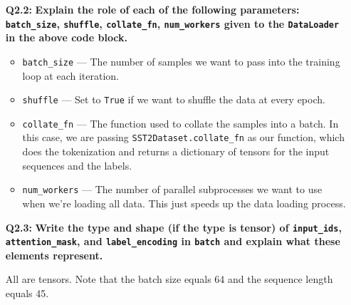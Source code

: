 \documentclass{article}
\begin{document}
\begin{itemize}
\begin{itemize}
        \item[\textbf{Q2.2:}] \textbf{Explain the role of each of the following
        parameters: \texttt{batch\_size}, \texttt{shuffle},
        \texttt{collate\_fn}, \texttt{num\_workers} given to the
        \texttt{DataLoader} in the above code block.}

        \begin{itemize}
            \item \texttt{batch\_size} --- The number of samples we want to pass
            into the training loop at each iteration.
            \item \texttt{shuffle} --- Set to \texttt{True} if we want to
            shuffle the data at every epoch.
            \item \texttt{collate\_fn} --- The function used to collate the
            samples into a batch. In this case, we are passing
            \texttt{SST2Dataset.collate\_fn} as our function, which does the
            tokenization and returns a dictionary of tensors for the input
            sequences and the labels.
            \item \texttt{num\_workers} --- The number of parallel subprocesses
            we want to use when we're loading all data. This just speeds up the
            data loading process.
        \end{itemize}
        
        \item[\textbf{Q2.3:}] \textbf{Write the \textbf{type} and \textbf{shape}
        (if the type is tensor) of \texttt{input\_ids},
        \texttt{attention\_mask}, and \texttt{label\_encoding} in \texttt{batch}
        and explain \textbf{what these elements represent}.}

        All are tensors. Note that the batch size equals 64 and the sequence
        length equals 45.


\end{itemize}
\end{itemize}
\end{document}
